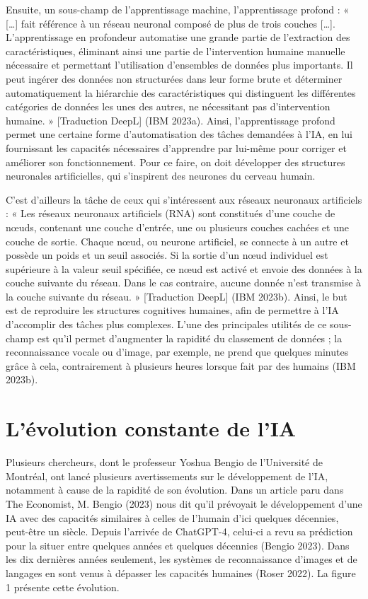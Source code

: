 \documentclass[
  letterpaper,
]{scrbook}
\begin{document}
Ensuite, un sous-champ de l'apprentissage machine, l'apprentissage
profond : « {[}\ldots{]} fait référence à un réseau neuronal composé de
plus de trois couches {[}\ldots{]}. L'apprentissage en profondeur
automatise une grande partie de l'extraction des caractéristiques,
éliminant ainsi une partie de l'intervention humaine manuelle nécessaire
et permettant l'utilisation d'ensembles de données plus importants. Il
peut ingérer des données non structurées dans leur forme brute et
déterminer automatiquement la hiérarchie des caractéristiques qui
distinguent les différentes catégories de données les unes des autres,
ne nécessitant pas d'intervention humaine. » {[}Traduction DeepL{]} (IBM
2023a). Ainsi, l'apprentissage profond permet une certaine forme
d'automatisation des tâches demandées à l'IA, en lui fournissant les
capacités nécessaires d'apprendre par lui-même pour corriger et
améliorer son fonctionnement. Pour ce faire, on doit développer des
structures neuronales artificielles, qui s'inspirent des neurones du
cerveau humain.

C'est d'ailleurs la tâche de ceux qui s'intéressent aux réseaux
neuronaux artificiels : « Les réseaux neuronaux artificiels (RNA) sont
constitués d'une couche de nœuds, contenant une couche d'entrée, une ou
plusieurs couches cachées et une couche de sortie. Chaque nœud, ou
neurone artificiel, se connecte à un autre et possède un poids et un
seuil associés. Si la sortie d'un nœud individuel est supérieure à la
valeur seuil spécifiée, ce nœud est activé et envoie des données à la
couche suivante du réseau. Dans le cas contraire, aucune donnée n'est
transmise à la couche suivante du réseau. » {[}Traduction DeepL{]} (IBM
2023b). Ainsi, le but est de reproduire les structures cognitives
humaines, afin de permettre à l'IA d'accomplir des tâches plus
complexes. L'une des principales utilités de ce sous-champ est qu'il
permet d'augmenter la rapidité du classement de données ; la
reconnaissance vocale ou d'image, par exemple, ne prend que quelques
minutes grâce à cela, contrairement à plusieurs heures lorsque fait par
des humains (IBM 2023b).

\hypertarget{luxe9volution-constante-de-lia}{%
\section{L'évolution constante de
l'IA}\label{luxe9volution-constante-de-lia}}

Plusieurs chercheurs, dont le professeur Yoshua Bengio de l'Université
de Montréal, ont lancé plusieurs avertissements sur le développement de
l'IA, notamment à cause de la rapidité de son évolution. Dans un article
paru dans The Economist, M. Bengio (2023) nous dit qu'il prévoyait le
développement d'une IA avec des capacités similaires à celles de
l'humain d'ici quelques décennies, peut-être un siècle. Depuis l'arrivée
de ChatGPT-4, celui-ci a revu sa prédiction pour la situer entre
quelques années et quelques décennies (Bengio 2023). Dans les dix
dernières années seulement, les systèmes de reconnaissance d'images et
de langages en sont venus à dépasser les capacités humaines (Roser
2022). La figure 1 présente cette évolution.
\end{document}
